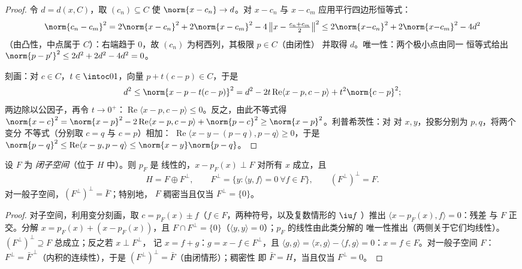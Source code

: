 \begin{proof}
令 $d = d(x, C)$，取 $(c_n) \subseteq C$ 使 $\norm{x - c_n}
\to d$。对 $x - c_n$ 与 $x - c_m$ 应用平行四边形恒等式：
\[
\norm{c_n - c_m}^2 = 2\norm{x - c_n}^2 + 2\norm{x - c_m}^2 -
4\,\bigl\|x - \tfrac{c_n + c_m}2\bigr\|^2
\leq 2\norm{x{-}c_n}^2 + 2\norm{x{-}c_m}^2 - 4d^2
\]
（由凸性，中点属于 $C$）：右端趋于
$0$，故 $(c_n)$ 为柯西列，其极限 $p \in C$（由闭性）
并取得 $d$。唯一性：两个极小点由同一
恒等式给出 $\norm{p - p'}^2 \leq 2d^2 + 2d^2 - 4d^2 = 0$。

刻画：对 $c \in C$，$t \in \intoc01$，向量
$p + t(c - p) \in C$，于是
\[
d^2 \leq \norm{x - p - t(c-p)}^2
= d^2 - 2t\operatorname{Re}\langle x - p, c - p\rangle +
t^2\norm{c-p}^2 ;
\]
两边除以公因子，再令 $t \to 0^+$：$\operatorname{Re}\langle x - p, c -
p\rangle \leq 0$。反之，由此不等式得 $\norm{x -
c}^2 = \norm{x - p}^2 - 2\operatorname{Re}\langle x - p, c -
p\rangle + \norm{p - c}^2 \geq \norm{x-p}^2$。利普希茨性：对
对 $x, y$，投影分别为 $p, q$，将两个变分
不等式（分别取 $c = q$ 与 $c = p$）相加：
$\operatorname{Re}\langle x - y - (p - q), p - q\rangle \geq
0$，于是 $\norm{p - q}^2 \leq \operatorname{Re}\langle x - y, p -
q\rangle \leq \norm{x - y}\norm{p - q}$。
\end{proof}

\begin{theorem}[正交分解]
\label{thm:b3:hilbert:decomposition}
设 $F$ 为 \emph{闭子空间}（位于 $H$ 中）。则 $p_F$ 是
线性的，$x - p_F(x) \perp F$ 对所有 $x$ 成立，且
\[
H = F \oplus F^\perp,
\qquad F^\perp = \{y : \langle y, f\rangle = 0\ \forall f\in
F\},
\qquad (F^\perp)^\perp = F .
\]
对一般子空间，$(F^\perp)^\perp = \bar F$；特别地，
$F$ 稠密当且仅当 $F^\perp = \{0\}$。
\end{theorem}

\begin{proof}
对子空间，利用变分刻画，取 $c =
p_F(x) \pm f$（$f \in F$，两种符号，以及复数情形的 $\iu f$
）推出 $\langle x - p_F(x), f\rangle = 0$：残差
与 $F$ 正交。分解 $x = p_F(x) + (x
- p_F(x))$，且 $F \cap F^\perp = \{0\}$（$\langle y, y
\rangle = 0$）；$p_F$ 的线性由此类分解的
唯一性推出（两侧关于它们均线性）。$(F^\perp)
^\perp \supseteq F$ 总成立；反之若 $x \perp F^\perp$，
记 $x = f + g$：$g = x - f \in F^\perp$，且 $\langle g,
g\rangle = \langle x, g\rangle - \langle f, g\rangle = 0$：$x
= f \in F$。对一般子空间 $F$：$F^\perp = \bar
F^{\,\perp}$（内积的连续性），于是
$(F^\perp)^\perp = \bar F$（由闭情形）；稠密性
即 $\bar F = H$，当且仅当 $F^\perp = 0$。
\end{proof}

